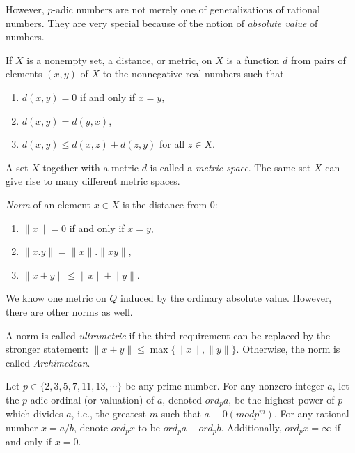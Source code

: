 \documentclass{llncs}
\begin{document}
However, $p$-adic numbers are not merely one of generalizations of rational numbers. They are very special because of the notion 
of {\em absolute value} of numbers. 


If $X$ is a nonempty set, a distance, or {metric}, on $X$ is a function $d$ from pairs of elements $(x,y)$ of $X$
to the nonnegative real numbers such that 
\begin{enumerate}
\item $d(x,y) = 0$ if and only if $x = y$,\\
\item $d(x,y) = d(y,x)$,\\
\item $d(x,y) \leq d(x,z) + d(z,y)$ for all $z \in X$.
\end{enumerate}

A set $X$ together with a metric $d$ is called a {\em metric space}. The same set $X$ can give rise to many different metric spaces.


{\em Norm} of an element $x \in X$ is the distance from $0$:
\begin{enumerate}
\item $\parallel x \parallel = 0$ if and only if $x = y$,\\
\item $\parallel x.y \parallel = \parallel x \parallel . \parallel xy \parallel $,\\
\item $\parallel x+y \parallel  \leq \parallel x \parallel  + \parallel y \parallel $.
\end{enumerate}

We know one metric on $Q$  induced by the ordinary absolute value. However, there are other norms as well.

A norm  is called {\em ultrametric}  if the third requirement can be replaced by the stronger statement:
$\parallel x+y \parallel  \leq \max \{\parallel x \parallel  , \parallel y \parallel \}$.
Otherwise, the norm is called {\em Archimedean}.

\begin{definition}
Let $p \in \{2,3,5,7,11,13,\cdots \}$ be any prime number. For any nonzero integer $a$, let the $p$-adic ordinal (or valuation) of $a$, denoted $ord_p a$, 
be the highest power of $p$ which divides $a$, i.e., the greatest $m$ such that $a \equiv 0 (mod p^{m})$. For any rational number $x = a/b$, 
denote $ord_p x$ to be $ord_p a - ord_p b$. Additionally, $ord_p x = \infty $ if and only if $x = 0$.
\end{definition}
\end{document}
